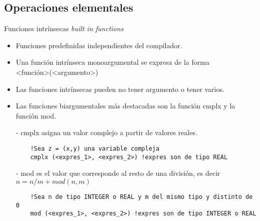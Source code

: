 
\subsection{Operaciones elementales}


\begin{frame}[fragile]{Funciones intrínsecas \textit{built in functions}}  
 \begin{itemize}[<+(0)->]
  \item Funciones predefinidas independientes del compilador. 
    \item Una función intrínseca monoargumental se expresa de la forma \\
      \centering <función>(<argumento>)\\ 
  \item Las funciones intrínsecas pueden no tener argumento o tener varios.
  \item Las funciones biargumentales más destacadas son la función cmplx y la función mod.
  \item [-] cmplx asigna un valor complejo a partir de valores reales. 
   \begin{verbatim}
    !Sea z = (x,y) una variable compleja
    cmplx (<expres_1>, <expres_2>) !expres son de tipo REAL
   \end{verbatim}
  \vspace{0.2cm}
  \item [-] mod es el valor que corresponde al resto de una división, es decir\\
      \centering $n = n/m + mod(n, m) $
   \begin{verbatim}
    !Sea n de tipo INTEGER o REAL y m del mismo tipo y distinto de 0
    mod (<expres_1>, <expres_2>) !expres son de tipo INTEGER o REAL
   \end{verbatim}  
 \end{itemize}
\end{frame}

